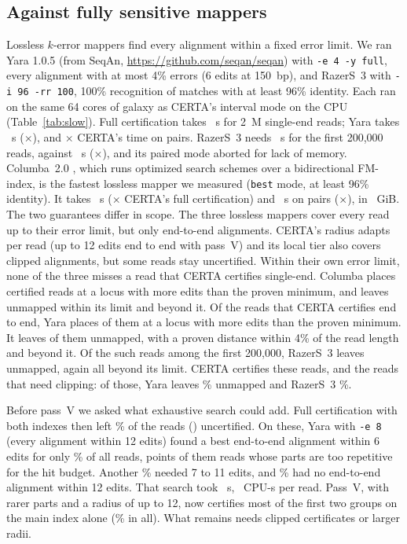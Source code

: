\documentclass[11pt]{article}
\theoremstyle{definition}
\begin{document}
\subsection{Against fully sensitive mappers}\label{sec:slow}

Lossless $k$-error mappers find every alignment within a fixed error
limit. We ran Yara 1.0.5 (from SeqAn, \url{https://github.com/seqan/seqan})
with \texttt{-e 4 -y full}, every alignment with at most 4\% errors (6 edits
at 150~bp), and RazerS~3 \citep{weese2012razers3} with \texttt{-i 96 -rr
100}, 100\% recognition of matches with at least 96\% identity. Each ran on
the same 64 cores of galaxy as CERTA's interval mode on the CPU
(Table~\ref{tab:slow}). Full certification takes \SlSeFcWall~s for 2~M
single-end reads; Yara takes \SlSeYaraWall~s (\SlSeYaraX$\times$), and
\SlPeYaraX$\times$ CERTA's time on pairs. RazerS~3 needs \SlRazWall~s for
the first 200,000 reads, against \SlRazCertaWall~s (\SlRazX$\times$), and
its paired mode aborted for lack of memory. Columba~2.0
\citep{renders2025columba}, which runs optimized search schemes over a
bidirectional FM-index, is the fastest lossless mapper we measured
(\texttt{best} mode, at least 96\% identity). It takes \SlColSeWall~s
(\SlColSeX$\times$ CERTA's full certification) and \SlColPeWall~s on pairs
(\SlColPeX$\times$), in \SlColSeRss~GiB. The two guarantees differ in
scope. The three lossless mappers cover every read up to their error
limit, but only end-to-end alignments. CERTA's radius adapts per read (up to 12 edits
end to end with pass~V) and its local tier also covers clipped alignments,
but some reads stay uncertified. Within their own error limit, none of the
three misses a read that CERTA certifies single-end. Columba places
\SlColElse{} certified reads at a locus with more edits than the proven
minimum, and leaves \SlColUnmWithin{} unmapped within its limit and
\SlColUnmBeyond{} beyond it. Of the \SlYaraEtoE{} reads that CERTA
certifies end to end, Yara places \SlYaraElse{} of them at a locus with more
edits than the proven minimum. It leaves \SlYaraUnm{} of them unmapped,
\SlYaraUnmWithin{} with a proven distance within 4\% of the read length and
\SlYaraUnmBeyond{} beyond it.
Of the \SlRazEtoE{} such reads among the first 200,000, RazerS~3 leaves
\SlRazEtoEUnm{} unmapped, again all beyond its limit. CERTA certifies these
reads, and the reads that need clipping: of those, Yara leaves
\SlYaraLocalUnmPct\% unmapped and RazerS~3 \SlRazLocalUnmPct\%.

Before pass~V we asked what exhaustive search could add. Full certification
with both indexes then left \HrUncPct\% of the reads (\HrUnc) uncertified.
On these, Yara with \texttt{-e 8} (every alignment within 12 edits) found a
best end-to-end alignment within 6 edits for only \HrLeSixPct\% of all
reads, \HrRepPct{} points of them reads whose parts are too repetitive for
the hit budget. Another \HrSevenElevenPct\% needed 7 to 11 edits, and
\HrNonePct\% had no end-to-end alignment within 12 edits. That search took
\HrYaraWall~s, \HrCpuPerRead~CPU-s per read. Pass~V, with rarer parts and a
radius of up to 12, now certifies most of the first two groups on the main
index alone (\SlSeFcCert\% in all). What remains needs clipped
certificates or larger radii.
\end{document}
